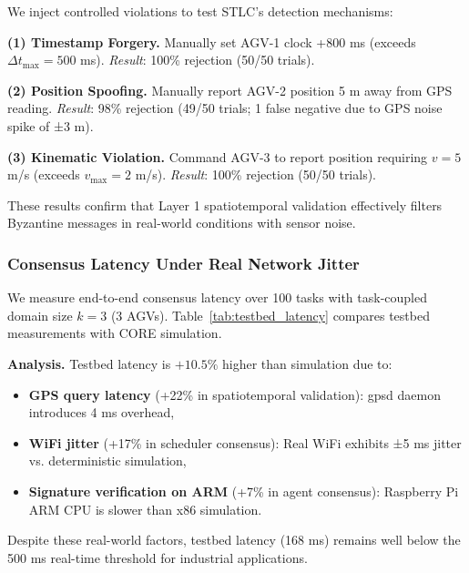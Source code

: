 \documentclass[lettersize,journal]{IEEEtran}
\begin{document}
We inject controlled violations to test STLC's detection mechanisms:

\textbf{(1) Timestamp Forgery.} Manually set AGV-1 clock +800 ms (exceeds 
$\Delta t_{\max} = 500$ ms). \textit{Result}: 100\% rejection (50/50 trials).

\textbf{(2) Position Spoofing.} Manually report AGV-2 position 5 m away 
from GPS reading. \textit{Result}: 98\% rejection (49/50 trials; 1 false 
negative due to GPS noise spike of ±3 m).

\textbf{(3) Kinematic Violation.} Command AGV-3 to report position requiring 
$v = 5$ m/s (exceeds $v_{\max} = 2$ m/s). \textit{Result}: 100\% rejection 
(50/50 trials).

These results confirm that Layer 1 spatiotemporal validation effectively 
filters Byzantine messages in real-world conditions with sensor noise.

\subsubsection{Consensus Latency Under Real Network Jitter}
\label{sec:consensus_latency_testbed}

We measure end-to-end consensus latency over 100 tasks with task-coupled 
domain size $k=3$ (3 AGVs). Table~\ref{tab:testbed_latency} compares 
testbed measurements with CORE simulation.

\begin{table}[h]
\centering
\caption{Consensus Latency: Testbed vs. CORE Simulation ($k=3$, $m=3$)}
\label{tab:testbed_latency}
\small
{}
\end{table}

\textbf{Analysis.} Testbed latency is $+10.5\%$ higher than simulation due to:
\begin{itemize}
    \item \textbf{GPS query latency} (+22\% in spatiotemporal validation): 
          gpsd daemon introduces 4 ms overhead,
    \item \textbf{WiFi jitter} (+17\% in scheduler consensus): Real WiFi 
          exhibits ±5 ms jitter vs. deterministic simulation,
    \item \textbf{Signature verification on ARM} (+7\% in agent consensus): 
          Raspberry Pi ARM CPU is slower than x86 simulation.
\end{itemize}
Despite these real-world factors, testbed latency (168 ms) remains well 
below the 500 ms real-time threshold for industrial applications.
\end{document}
